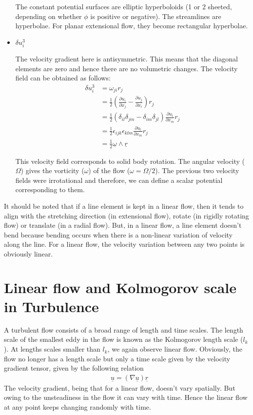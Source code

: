 \documentclass[11pt,a4paper]{article}
\newcommand{\dl}{\delta}
\newcommand{\pd}[2]{\frac{\partial #1}{\partial #2}}
\newcommand{\vv}[1]{\underline{#1}}
\newcommand{\vu}{\underline{u}}
\newcommand{\1}{\vect{1}}
\newcommand{\grad}{\nabla}
\newcommand{\half}{\frac{1}{2}}
\begin{document}
\begin{itemize}
The constant potential surfaces are elliptic hyperboloids (1 or 2 sheeted, depending on whether $\phi$ is positive or negative). The streamlines are hyperbolae. For planar extensional flow, they become rectangular hyperbolae.

\item $\dl u^3_i$

The velocity gradient here is antisymmetric. This means that the diagonal elements are zero and hence there are no volumetric changes. The velocity field can be obtained as follows:
\begin{align*}
\dl u^3_i &= \omega_{ji} r_j\\
&= \half (\pd{u_i}{x_j} - \pd{u_j}{x_i})r_j\\ 
&= \half (\dl_{il}\dl_{jm}-\dl_{im}\dl_{jl})\pd{u_l}{x_m} r_j\\
&= \half \epsilon_{ijk}\epsilon_{klm}\pd{u_l}{x_m} r_j\\
&= \half \vv \omega \wedge \vv r
\end{align*}

 This velocity field corresponds to solid body rotation. The angular velocity ($\Omega$) gives the vorticity ($\omega$) of the flow ($\omega = \Omega/2$). The previous two velocity fields were irrotational and therefore, we can define a scalar potential corresponding to them.

\end{itemize}

It should be noted that if a line element is kept in a linear flow, then it tends to align with the stretching direction (in extensional flow), rotate (in rigidly rotating flow) or translate (in a radial flow). But, in a linear flow, a line element doesn't bend because bending occurs when there is a non-linear variation of velocity along the line. For a linear flow, the velocity variation between any two points is obviously linear.

\section{Linear flow and Kolmogorov scale in Turbulence}

A turbulent flow consists of a broad range of length and time scales. The length scale of the smallest eddy in the flow is known as the Kolmogorov length scale ($l_k$). At lengths scales smaller than $l_k$, we again observe linear flow. Obviously, the flow no longer has a length scale but only a time scale given by the velocity gradient tensor, given by the following relation
\begin{align*}
&\vu = (\grad \vu) \vv r
\end{align*}
The velocity gradient, being that for a linear flow, doesn't vary spatially. But owing to the unsteadiness in the flow it can vary with time. Hence the linear flow at any point keeps changing randomly with time. 
\end{document}
